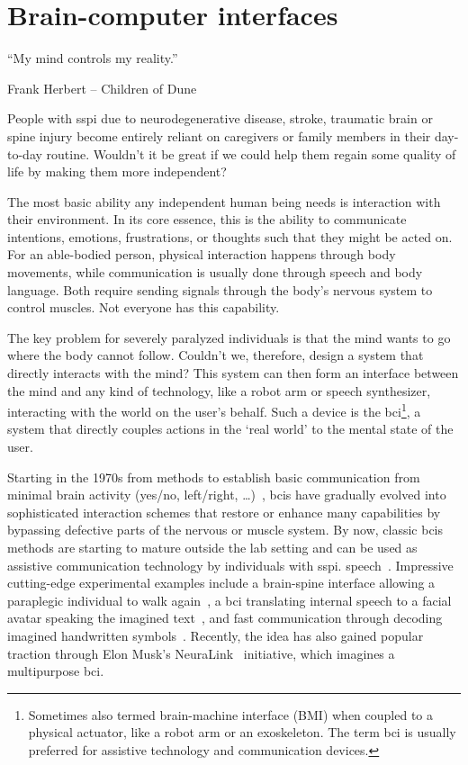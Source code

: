 \chapter{Brain-computer interfaces}
\label{sec:bci}
\epigraph{``My mind controls my reality.''}{Frank Herbert -- Children of Dune}

People with \ac{sspi} due to neurodegenerative disease, stroke, traumatic brain or spine
injury become entirely reliant on caregivers or family members in their day-to-day
routine.
Wouldn't it be great if we could help them regain some quality of life by making them
more independent?

The most basic ability any independent human being needs is interaction with their
environment.
In its core essence, this is the ability to communicate intentions, emotions,
frustrations, or thoughts such that they might be acted on.
For an able-bodied person, physical interaction happens through body movements, while
communication is usually done through speech and body language.
Both require sending signals through the body's nervous system to control muscles.
Not everyone has this capability.

The key problem for severely paralyzed individuals is that the mind wants to go where the
body cannot follow.
Couldn't we, therefore, design a system that directly interacts with the mind?
This system can then form an interface between the mind and any kind of technology, like
a robot arm or speech synthesizer, interacting with the world on the user's behalf.
Such a device is the \ac{bci}\footnote{Sometimes also termed brain-machine interface
(BMI) when coupled to a physical actuator, like a robot arm or an exoskeleton.
The term \ac{bci} is usually preferred for assistive technology and communication
devices.}, a system that directly couples actions in the `real world' to the mental state
of the user.

Starting in the 1970s from methods to establish basic communication from minimal brain
activity (yes/no, left/right, \ldots)~\cite{Wolpaw2002}, \acp{bci} have gradually evolved
into sophisticated interaction schemes that restore or enhance many capabilities by
bypassing defective parts of the nervous or muscle system.
By now, classic \acp{bci} methods are starting to mature outside the lab setting and can
be used as assistive communication technology by individuals with \acl{sspi}.
speech~\cite{Wolpaw2018,Milekovic2018}.
Impressive cutting-edge experimental examples include a brain-spine interface allowing a
paraplegic individual to walk again~\cite{Lorach2023}, a \ac{bci} translating internal
speech to a facial avatar speaking the imagined text~\cite{Metzger2023}, and fast
communication through decoding imagined handwritten symbols~\cite{Willett2021}.
Recently, the idea has also gained popular traction through Elon Musk's
NeuraLink~\cite{Musk2019} initiative, which imagines a multipurpose \ac{bci}.

